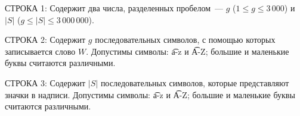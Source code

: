 СТРОКА 1: Содержит два числа, разделенных пробелом~--- $g$ ($1 \le g \le 3\,000$) и $|S|$ ($g \le |S| \le 3\,000\,000$).

СТРОКА 2: Содержит $g$ последовательных символов, с помощью которых записывается слово $W$. Допустимы символы: \t{a-z} и \t{A-Z}; большие и маленькие буквы считаются
различными.

СТРОКА 3: Содержит $|S|$ последовательных символов, которые представляют значки в надписи. Допустимы символы: \t{a-z} и \t{A-Z}; большие и маленькие буквы считаются
различными.